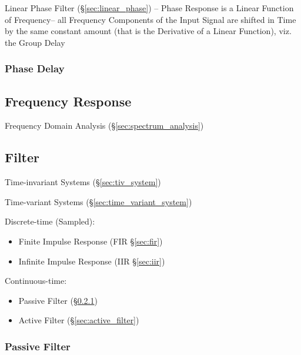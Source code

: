 Linear Phase Filter (\S\ref{sec:linear_phase}) -- Phase Response is a Linear
Function of Frequency-- all Frequency Components of the Input Signal are shifted
in Time by the same constant amount (that is the Derivative of a Linear
Function), viz. the Group Delay



\subsubsection{Phase Delay}\label{sec:phase_delay}



\subsection{Frequency Response}\label{sec:frequency_response}

\fist Frequency Domain Analysis (\S\ref{sec:spectrum_analysis})



\subsection{Filter}\label{sec:signal_filter}

Time-invariant Systems (\S\ref{sec:tiv_system})

Time-variant Systems (\S\ref{sec:time_variant_system})

Discrete-time (Sampled):
\begin{itemize}
  \item Finite Impulse Response (FIR \S\ref{sec:fir})
  \item Infinite Impulse Response (IIR \S\ref{sec:iir})
\end{itemize}

Continuous-time:
\begin{itemize}
  \item Passive Filter (\S\ref{sec:passive_filter})
  \item Active Filter (\S\ref{sec:active_filter})
\end{itemize}



\subsubsection{Passive Filter}\label{sec:passive_filter}

